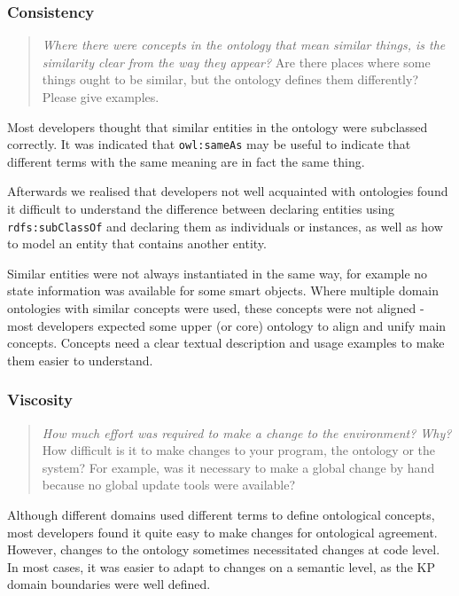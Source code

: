 \subsubsection{Consistency}

\begin{quote}
	\emph{Where there were concepts in the ontology that mean similar things, is the similarity clear from the way they appear?}
	Are there places where some things ought to be similar, but the ontology defines them differently? Please give examples.
\end{quote}

Most developers thought that similar entities in the ontology were subclassed correctly. It was indicated that \texttt{owl:sameAs} may be useful to indicate that different terms with the same meaning are in fact the same thing.

Afterwards we realised that developers not well acquainted with ontologies found it difficult to understand the difference between declaring entities using \texttt{rdfs:sub\-Class\-Of} and declaring them as individuals or instances, as well as how to model an entity that contains another entity.

Similar entities were not always instantiated in the same way, for example no state information was available for some smart objects.
Where multiple domain ontologies with similar concepts were used, these concepts were not aligned - most developers expected some upper (or core) ontology to align and unify main concepts.
Concepts need a clear textual description and usage examples to make them easier to understand.

\subsubsection{Viscosity}

\begin{quote}
	\emph{How much effort was required to make a change to the environment? Why?}
	How difficult is it to make changes to your program, the ontology or the system? For example, was it necessary to make a global change by hand because no global update tools were available?
\end{quote}

Although different domains used different terms to define ontological concepts, most developers found it quite easy to make changes for ontological agreement. However, changes to the ontology sometimes necessitated changes at code level. In most cases, it was easier to adapt to changes on a semantic level, as the \ac{KP} domain boundaries were well defined.

